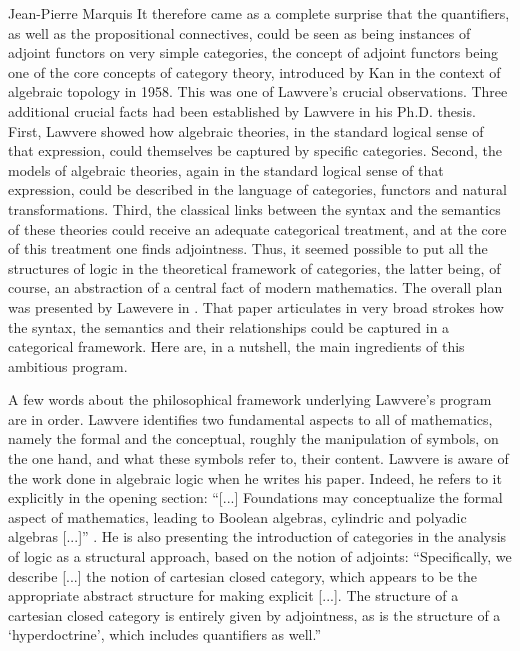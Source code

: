\begin{artengenv}{Jean-Pierre Marquis}
It therefore came as a complete surprise that the quantifiers, as well as the propositional connectives, could be seen as being instances of adjoint functors on very simple categories, the concept of adjoint functors being one of the core concepts of category theory, introduced by Kan in the context of algebraic topology in 1958. This was one of Lawvere's crucial observations. Three additional crucial facts had been established by Lawvere in his Ph.D. thesis. First,   Lawvere showed how  algebraic theories, in the standard logical sense of that expression, could themselves be captured by specific categories. Second, the models of algebraic theories, again in the standard logical sense of that expression, could be described in the language of categories, functors and natural transformations. Third, the classical links between the syntax and the semantics of these theories could receive an adequate categorical treatment, and at the core of this treatment one finds adjointness. Thus, it seemed possible to put all the structures of logic in the theoretical framework of categories, the latter being, of course, an abstraction of a central fact of modern mathematics. The overall plan was presented by Lawevere in \parencite*{Lawvere1969a}. That paper articulates in very broad strokes how the syntax, the semantics and their relationships could be captured in a categorical framework. Here are, in a nutshell, the main ingredients of this ambitious program.

A few words about the philosophical framework underlying Lawvere's program are in order. Lawvere identifies two fundamental aspects to all of mathematics, namely the formal and the conceptual, roughly the manipulation of symbols, on the one hand, and what these symbols refer to, their content. Lawvere is aware of the work done in algebraic logic when he writes his paper. Indeed, he refers to it explicitly in the opening section: ``[...] Foundations may conceptualize the formal aspect of mathematics, leading to Boolean algebras, cylindric and polyadic algebras [...]'' \parencite[][p.281]{Lawvere1969a}. He is also presenting the introduction of categories in the analysis of logic as a structural approach, based on the notion of adjoints: ``Specifically, we describe [...] the notion of cartesian closed category, which appears to be the appropriate abstract structure for making explicit [...]. The structure of a cartesian closed category is entirely given by adjointness, as is the structure of a `hyperdoctrine', which includes quantifiers as well.'' \parencite[][p.281]{Lawvere1969a} 


\end{artengenv}
